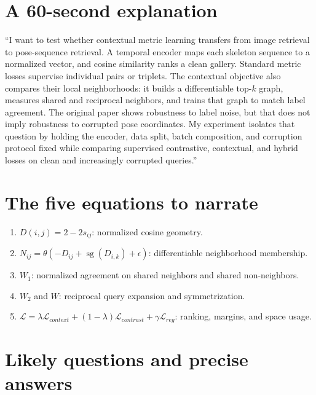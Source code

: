 \documentclass[11pt,oneside,openany]{book}
\theoremstyle{myplain}
\theoremstyle{definition}
\newcommand{\sg}{\operatorname{sg}}
\begin{document}
\section{A 60-second explanation}

\begin{meetingbox}[title=Use this almost verbatim]
``I want to test whether contextual metric learning transfers from image retrieval to pose-sequence retrieval. A temporal encoder maps each skeleton sequence to a normalized vector, and cosine similarity ranks a clean gallery. Standard metric losses supervise individual pairs or triplets. The contextual objective also compares their local neighborhoods: it builds a differentiable top-$k$ graph, measures shared and reciprocal neighbors, and trains that graph to match label agreement. The original paper shows robustness to label noise, but that does not imply robustness to corrupted pose coordinates. My experiment isolates that question by holding the encoder, data split, batch composition, and corruption protocol fixed while comparing supervised contrastive, contextual, and hybrid losses on clean and increasingly corrupted queries.''
\end{meetingbox}

\section{The five equations to narrate}

\begin{enumerate}[leftmargin=*,itemsep=7pt]
  \item $D(i,j)=2-2s_{ij}$: normalized cosine geometry.
  \item $N_{ij}=\theta(-D_{ij}+\sg(D_{i,k})+\epsilon)$: differentiable neighborhood membership.
  \item $W_1$: normalized agreement on shared neighbors and shared non-neighbors.
  \item $W_2$ and $W$: reciprocal query expansion and symmetrization.
  \item $\mathcal L=\lambda\mathcal L_{context}+(1-\lambda)\mathcal L_{contrast}+\gamma\mathcal L_{reg}$: ranking, margins, and space usage.
\end{enumerate}

\section{Likely questions and precise answers}
\end{document}
